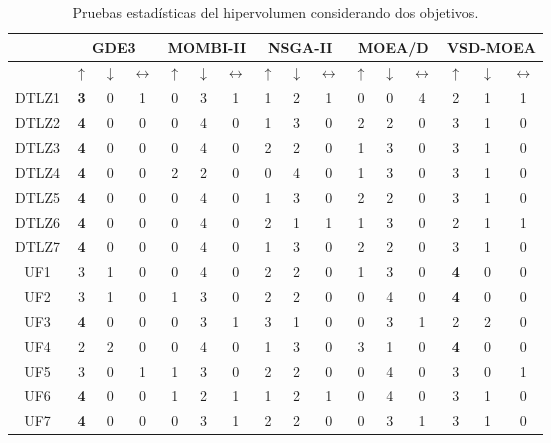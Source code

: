 \begin{table}[h]
\centering
\caption{Pruebas estadísticas del hipervolumen considerando dos objetivos.}
\label{tab:Statistical_Test_2obj}
\resizebox{\WidthTable}{!}
{%
\begin{tabular}{|c|c|c|c|c|c|c|c|c|c|c|c|c|c|c|c|}
\hline
 & \multicolumn{3}{c|}{GDE3} & \multicolumn{3}{c|}{MOMBI-II} & \multicolumn{3}{c|}{NSGA-II} & \multicolumn{3}{c|}{MOEA/D} & \multicolumn{3}{c|}{VSD-MOEA} \\ \hline
 & $\uparrow$ & $\downarrow$ & $\leftrightarrow$ & $\uparrow$ & $\downarrow$ & $\leftrightarrow$ & $\uparrow$ & $\downarrow$ & $\leftrightarrow$ & $\uparrow$ & $\downarrow$ & $\leftrightarrow$ & $\uparrow$ & $\downarrow$ & $\leftrightarrow$ \\ \hline
DTLZ1 & \textbf{3} & 0 & 1 & 0 & 3 & 1 & 1 & 2 & 1 & 0 & 0 & 4 & 2 & 1 & 1 \\ \hline
DTLZ2 & \textbf{4} & 0 & 0 & 0 & 4 & 0 & 1 & 3 & 0 & 2 & 2 & 0 & 3 & 1 & 0 \\ \hline
DTLZ3 & \textbf{4} & 0 & 0 & 0 & 4 & 0 & 2 & 2 & 0 & 1 & 3 & 0 & 3 & 1 & 0 \\ \hline
DTLZ4 & \textbf{4} & 0 & 0 & 2 & 2 & 0 & 0 & 4 & 0 & 1 & 3 & 0 & 3 & 1 & 0 \\ \hline
DTLZ5 & \textbf{4} & 0 & 0 & 0 & 4 & 0 & 1 & 3 & 0 & 2 & 2 & 0 & 3 & 1 & 0 \\ \hline
DTLZ6 & \textbf{4} & 0 & 0 & 0 & 4 & 0 & 2 & 1 & 1 & 1 & 3 & 0 & 2 & 1 & 1 \\ \hline
DTLZ7 & \textbf{4} & 0 & 0 & 0 & 4 & 0 & 1 & 3 & 0 & 2 & 2 & 0 & 3 & 1 & 0 \\ \hline
UF1 & 3 & 1 & 0 & 0 & 4 & 0 & 2 & 2 & 0 & 1 & 3 & 0 & \textbf{4} & 0 & 0 \\ \hline
UF2 & 3 & 1 & 0 & 1 & 3 & 0 & 2 & 2 & 0 & 0 & 4 & 0 & \textbf{4} & 0 & 0 \\ \hline
UF3 & \textbf{4} & 0 & 0 & 0 & 3 & 1 & 3 & 1 & 0 & 0 & 3 & 1 & 2 & 2 & 0 \\ \hline
UF4 & 2 & 2 & 0 & 0 & 4 & 0 & 1 & 3 & 0 & 3 & 1 & 0 & \textbf{4} & 0 & 0 \\ \hline
UF5 & 3 & 0 & 1 & 1 & 3 & 0 & 2 & 2 & 0 & 0 & 4 & 0 & 3 & 0 & 1 \\ \hline
UF6 & \textbf{4} & 0 & 0 & 1 & 2 & 1 & 1 & 2 & 1 & 0 & 4 & 0 & 3 & 1 & 0 \\ \hline
UF7 & \textbf{4} & 0 & 0 & 0 & 3 & 1 & 2 & 2 & 0 & 0 & 3 & 1 & 3 & 1 & 0 \\ \hline

\end{tabular}}
\end{table}
